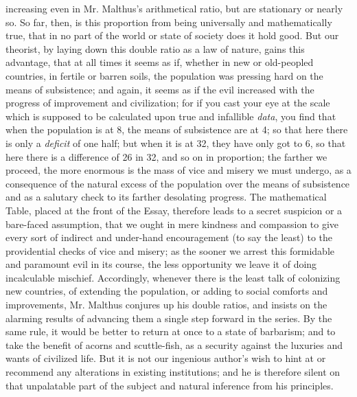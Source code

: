 increasing even in Mr. Malthus's arithmetical ratio, but are
stationary or nearly so. So far, then, is this proportion from
being universally and mathematically true, that in no part of the
world or state of society does it hold good. But our theorist, by
laying down this double ratio as a law of nature, gains this
advantage, that at all times it seems as if, whether in new or
old-peopled countries, in fertile or barren soils, the population
was pressing hard on the means of subsistence; and again, it seems
as if the evil increased with the progress of improvement and
civilization; for if you cast your eye at the scale which is
supposed to be calculated upon true and infallible \emph{data},
you find that when the population is at 8, the means of
subsistence are at 4; so that here there is only a \emph{deficit}
of one half; but when it is at 32, they have only got to 6, so
that here there is a difference of 26 in 32, and so on in
proportion; the farther we proceed, the more enormous is the mass
of vice and misery we must undergo, as a consequence of the
natural excess of the population over the means of subsistence and
as a salutary check to its farther desolating progress. The
mathematical Table, placed at the front of the Essay, therefore
leads to a secret suspicion or a bare-faced assumption, that we
ought in mere kindness and compassion to give every sort of
indirect and under-hand encouragement (to say the least) to the
providential checks of vice and misery; as the sooner we arrest
this formidable and paramount evil in its course, the less
opportunity we leave it of doing incalculable
mischief. Accordingly, whenever there is the least talk of
colonizing new countries, of extending the population, or adding
to social comforts and improvements, Mr. Malthus conjures up his
double ratios, and insists on the alarming results of advancing
them a single step forward in the series. By the same rule, it
would be better to return at once to a state of barbarism; and to
take the benefit of acorns and scuttle-fish, as a security against
the luxuries and wants of civilized life. But it is not our
ingenious author's wish to hint at or recommend any alterations in
existing institutions; and he is therefore silent on that
unpalatable part of the subject and natural inference from his
principles.

